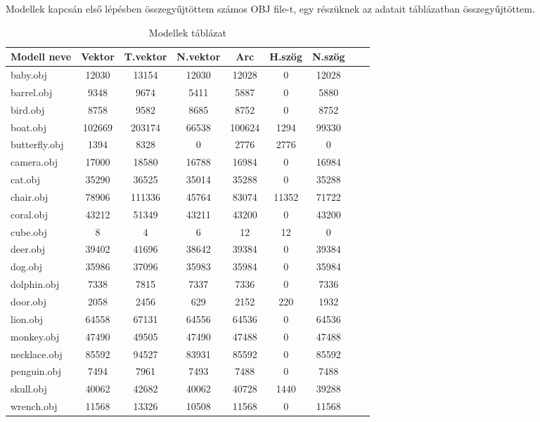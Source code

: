
Modellek kapcsán első lépésben összegyűjtöttem számos OBJ file-t, egy részüknek az adatait  táblázatban összegyűjtöttem.
\bigskip
\begin{table}[h]
\centering
\caption{Modellek táblázat}
\bigskip
\label{tab:modellek}
\begin{tabular}{|l|c|c|c|c|c|c|c|c|}
Modell neve& Vektor & T.vektor & N.vektor & Arc & H.szög & N.szög \\
\hline
baby.obj & 12030 & 13154 & 12030 & 12028 & 0 & 12028 \\
barrel.obj & 9348 & 9674 & 5411 & 5887 & 0 & 5880	\\
bird.obj & 8758 & 9582 & 8685 & 8752 & 0 & 8752 \\
boat.obj & 102669 & 203174 & 66538 & 100624 & 1294 & 99330\\
butterfly.obj & 1394 &	8328 &	0 & 2776 &	2776 &	0 \\
camera.obj & 17000 & 18580 & 16788 & 16984 & 0 & 16984 \\
cat.obj & 35290 & 36525 & 35014 & 35288 & 0 &	35288 \\
chair.obj & 78906 & 111336 & 45764 & 83074 & 11352 & 71722 \\
coral.obj & 43212 & 51349 & 43211 & 43200 & 0 & 43200 \\
cube.obj & 8 & 4 & 6 & 12 & 12 & 0 \\
deer.obj & 39402 & 41696 & 38642 & 39384 & 0 & 39384 \\
dog.obj & 35986 & 37096 & 35983 & 35984 & 0 & 35984 \\
dolphin.obj & 7338 & 7815 & 7337 & 7336 & 0 & 7336 \\
door.obj & 2058 & 2456 & 629 & 2152 &	220 & 1932 \\
lion.obj & 64558 & 67131 & 64556 & 64536 & 0 & 64536 \\
monkey.obj & 47490 & 49505 & 47490 & 47488 & 0 & 47488 \\
necklace.obj & 85592 &	94527 & 83931 & 85592 & 0 & 85592 \\
penguin.obj & 7494 & 7961 & 7493 & 7488 & 0 & 7488 \\
skull.obj & 40062 & 42682 & 40062 & 40728 & 1440 & 39288 \\
wrench.obj & 11568 & 13326 & 10508 & 11568 & 0 & 11568 \\
\hline
\end{tabular}
\label{fig:modellekt}
\end{table}

